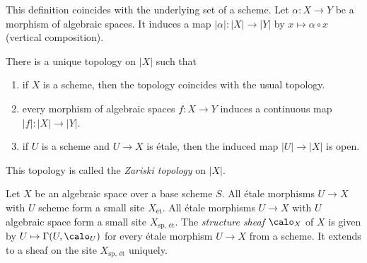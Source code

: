     This definition coincides with the underlying set of a scheme.
    Let \(\alpha: X \to Y\) be a morphism of algebraic spaces.
    It induces a map \(|\alpha|: |X| \to |Y|\) by \(x \mapsto \alpha \circ x\) (vertical composition).

    \begin{proposition}\label{prop:underlying_topological_space_of_algebraic_space}
        There is a unique topology on \(|X|\) such that
        \begin{enumerate}
            \item if \(X\) is a scheme, then the topology coincides with the usual topology.
            \item every morphism of algebraic spaces \(f: X \to Y\) induces a continuous map \(|f|: |X| \to |Y|\).
            \item if \(U\) is a scheme and \(U \to X\) is \'etale, then the induced map \(|U| \to |X|\) is open.
        \end{enumerate}
    \end{proposition}

    This topology is called the \emph{Zariski topology} on \(|X|\).

    \begin{definition}\label{def:structure_sheaf_of_algebraic_space}
        Let \(X\) be an algebraic space over a base scheme \(S\).
        All \'etale morphisms \(U \to X\) with \(U\) scheme form a small site \(X_{\text{\'et}}\).
        All \'etale morphisms \(U \to X\) with \(U\) algebraic space form a small site \(X_{\text{sp, \'et}}\).
        The \emph{structure sheaf} \(\calo_X\) of \(X\) is given by \(U \mapsto \Gamma(U,\calo_U)\) for every \'etale morphism \(U \to X\) from a scheme.
        It extends to a sheaf on the site \(X_{\text{sp, \'et}}\) uniquely.
    \end{definition}

